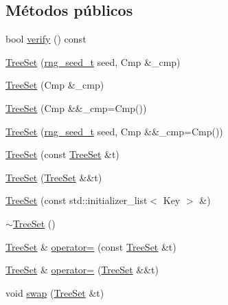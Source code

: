 \subsection*{Métodos públicos}
\begin{DoxyCompactItemize}
\item 
bool \hyperlink{class_designar_1_1_tree_set_a36429c32537114bae9108bf57171d8c6}{verify} () const
\item 
\hyperlink{class_designar_1_1_tree_set_a188c4a4093595878dba7e38b249cb024}{Tree\+Set} (\hyperlink{namespace_designar_ad621b5646d45288c5d6a1e1dfe7531a8}{rng\+\_\+seed\+\_\+t} seed, Cmp \&\+\_\+cmp)
\item 
\hyperlink{class_designar_1_1_tree_set_adeb0456caadfe5e105d2070bf8405d47}{Tree\+Set} (Cmp \&\+\_\+cmp)
\item 
\hyperlink{class_designar_1_1_tree_set_a41e2a227975e1e8adfe261adf99502e7}{Tree\+Set} (Cmp \&\&\+\_\+cmp=Cmp())
\item 
\hyperlink{class_designar_1_1_tree_set_a18b64c4f5ac3d0a4eb4d4e242ea4b4df}{Tree\+Set} (\hyperlink{namespace_designar_ad621b5646d45288c5d6a1e1dfe7531a8}{rng\+\_\+seed\+\_\+t} seed, Cmp \&\&\+\_\+cmp=Cmp())
\item 
\hyperlink{class_designar_1_1_tree_set_adca348df928acd414db780df7ba541c1}{Tree\+Set} (const \hyperlink{class_designar_1_1_tree_set}{Tree\+Set} \&t)
\item 
\hyperlink{class_designar_1_1_tree_set_a3bcb33bcd631e61727cd5e743f83b474}{Tree\+Set} (\hyperlink{class_designar_1_1_tree_set}{Tree\+Set} \&\&t)
\item 
\hyperlink{class_designar_1_1_tree_set_a177fd1706ba0536b0bc10787c561836c}{Tree\+Set} (const std\+::initializer\+\_\+list$<$ Key $>$ \&)
\item 
\hyperlink{class_designar_1_1_tree_set_af1c4be1e69a6bcaab42f81668df410d5}{$\sim$\+Tree\+Set} ()
\item 
\hyperlink{class_designar_1_1_tree_set}{Tree\+Set} \& \hyperlink{class_designar_1_1_tree_set_a555a6bff8e5771f3cd7a36228678fdcf}{operator=} (const \hyperlink{class_designar_1_1_tree_set}{Tree\+Set} \&t)
\item 
\hyperlink{class_designar_1_1_tree_set}{Tree\+Set} \& \hyperlink{class_designar_1_1_tree_set_ae32129aa1ab3d699d72399b35e9d22a5}{operator=} (\hyperlink{class_designar_1_1_tree_set}{Tree\+Set} \&\&t)
\item 
void \hyperlink{class_designar_1_1_tree_set_a8b6afa1f2400d4d7e1dc9694046eadcb}{swap} (\hyperlink{class_designar_1_1_tree_set}{Tree\+Set} \&t)
\item 

\end{DoxyCompactItemize}
